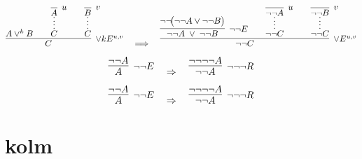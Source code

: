 \documentclass{article}
\begin{document}
\vspace{3em}
\[
\infer[\lor kE^{u,v}]{C}{
    {A \lor^{k} B}
    \hspace{2em}
    \infer*[]{C}{\infer[u]{A}{}}
    \hspace{2em}
    \infer*[]{C}{\infer[v]{B}{}}
}
\quad\Longrightarrow\quad
\infer[\lor E^{u,v}]{\neg\neg C}{
    \infer[\neg\neg E]{\neg\neg A \;\lor\; \neg\neg B}{
        \neg\neg\!\bigl(\neg\neg A \lor \neg\neg B\bigr)}
    \hspace{2em}
    \infer*[]{\neg\neg C}{
        \infer[u]{\neg\neg A}{}}
    \hspace{2em}
    \infer*[]{\neg\neg C}{
        \infer[v]{\neg\neg B}{}}
}
\]





\vspace{3em}
\[
\infer[\neg\neg E]{A}{
    \neg\neg A
}
\quad \Rightarrow \quad
\infer[\neg\neg\neg R]{\neg \neg A}{
    \neg\neg\neg\neg A
}
\]

\vspace{3em}
\[
\infer[\neg\neg E]{A}{
    \neg\neg A
}
\quad \Rightarrow \quad
\infer[\neg\neg\neg R]{\neg \neg A}{
    \neg\neg\neg\neg A
}
\]







\section{kolm}
\end{document}
